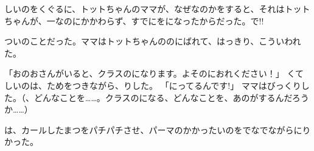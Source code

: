 しいのをくぐるに、トットちゃんのママが、なぜなのかをすると、それはトットちゃんが、一なのにかかわらず、すでにをになったからだった。で!!

ついのことだった。ママはトットちゃんののにばれて、はっきり、こういわれた。

「おのおさんがいると、クラスのになります。よそのにおれください！」 くてしいのは、ためをつきながら、りした。 「にってるんです!」 ママはびっくりした。（、どんなことを……。クラスのになる、どんなことを、あのがするんだろうか……）

は、カールしたまつをパチパチさせ、パーマのかかったいのをでなでながらにりかった。

